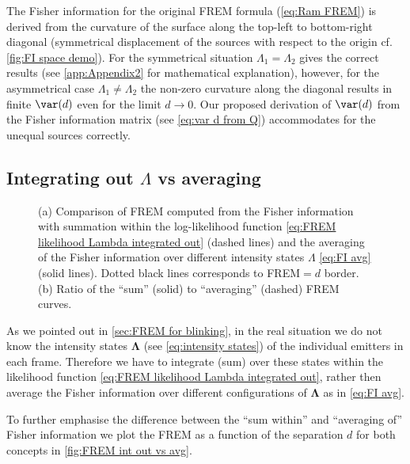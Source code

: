 The Fisher information for the original FREM formula (\autoref{eq:Ram FREM}) is derived from the curvature of the surface along the top-left to bottom-right diagonal (symmetrical displacement of the sources with respect to the origin cf. \autoref{fig:FI space demo}). For the symmetrical situation $\Lambda_1=\Lambda_2$ gives the correct results (see \autoref{app:Appendix2} for mathematical explanation), however, for the asymmetrical case $\Lambda_1\neq\Lambda_2$ the non-zero curvature along the diagonal results in finite $\var(d)$ even for the limit $d\rightarrow 0$. Our proposed derivation of $\var(d)$ from the Fisher information matrix (see \autoref{eq:var d from Q}) accommodates for the unequal sources correctly. 

\subsection{Integrating out $\Lambda$ vs averaging\label{sub:Int out vs avg}}
\begin{figure}[!hbt]
	\centering
	\newcommand{\wf}{.49\textwidth}
	\caption{(a) Comparison of FREM computed from the Fisher information with summation within the log-likelihood function \autoref{eq:FREM likelihood Lambda integrated out} (dashed lines) and the averaging of the Fisher information over different intensity states $\Lambda$ \autoref{eq:FI avg} (solid lines). Dotted black lines corresponds to FREM$=d$ border. (b) Ratio of the ``sum'' (solid) to ``averaging'' (dashed) FREM curves.}	
	\label{fig:FREM int out vs avg}
\end{figure}
% 
As we pointed out in \autoref{sec:FREM for blinking}, in the real situation we do not know the intensity states $\bm{\Lambda}$ (see \autoref{eq:intensity states}) of the individual emitters in each frame. Therefore  we have to integrate (sum) over these states within the likelihood function \autoref{eq:FREM likelihood Lambda integrated out}, rather then average the Fisher information over different configurations of $\bm{\Lambda}$ as in \autoref{eq:FI avg}. 

To further emphasise the difference between the ``sum within'' and ``averaging of'' Fisher information we plot the FREM as a function of the separation $d$ for both concepts in \autoref{fig:FREM int out vs avg}.

